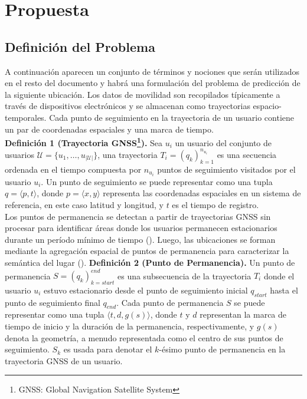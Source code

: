 \chapter{Propuesta}\label{chapter:proposal}
\section{Definición del Problema}

A continuación aparecen un conjunto de términos y nociones 
que ser\'an utilizados en el resto del documento y habr\'a una formulación del problema de 
predicción de la siguiente ubicación. Los datos de movilidad son 
recopilados típicamente a través de dispositivos electrónicos y se 
almacenan como trayectorias espacio-temporales. Cada punto de 
seguimiento en la trayectoria de un usuario contiene un par de 
coordenadas espaciales y una marca de tiempo.\\

\textbf{Definición 1 (Trayectoria GNSS\footnote{GNSS: Global Navigation Satellite System}).} 
Sea $u_i$ un usuario del conjunto de usuarios 
$\mathcal{U} = \{u_1, \dots, u_{|\mathcal{U}|} \}$, una trayectoria 
$T_i = (q_k)_{k=1}^{n_{u_i}}$ es una secuencia ordenada en el 
tiempo compuesta por $n_{u_i}$ puntos de seguimiento visitados por
el usuario $u_i$. Un punto de seguimiento se puede representar 
como una 
tupla $q = \langle p, t \rangle$, donde $p = \langle x, y \rangle$ 
representa las coordenadas espaciales en un sistema de referencia, 
en este caso latitud y longitud, y $t$ es el tiempo de registro.\\

Los puntos de permanencia se detectan a partir de trayectorias GNSS 
sin procesar para identificar áreas donde los usuarios permanecen 
estacionarios durante un período mínimo de tiempo (\cite{li2008mining}). 
Luego, las ubicaciones se forman mediante la agregación espacial 
de puntos de permanencia para caracterizar la semántica del lugar (\cite{hariharan2004project,martin2023trackintel}).
\newpage
\textbf{Definición 2 (Punto de Permanencia).} 
Un punto de permanencia $S = (q_k)_{k=start}^{end}$ es una 
subsecuencia de la trayectoria $T_i$ donde el usuario $u_i$ estuvo 
estacionario desde el punto de seguimiento inicial $q_{start}$ 
hasta el punto de seguimiento final $q_{end}$. Cada punto de 
permanencia $S$ se puede representar como una tupla 
$\langle t, d, g(s) \rangle$, donde $t$ y $d$ representan la 
marca de tiempo de inicio y la duración de la permanencia, 
respectivamente, y $g(s)$ denota la geometría, a menudo 
representada como el centro de sus puntos de seguimiento. 
$S_k$ es usada para denotar el $k$-ésimo punto de permanencia 
en la trayectoria GNSS de un usuario.\\


